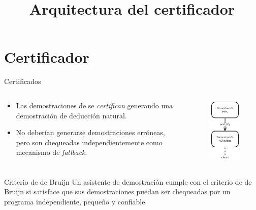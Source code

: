 \documentclass[xcolor={dvipsnames},spanish]{beamer}
\begin{document}
\section{Certificador}

\begin{frame}{Certificados}
    \begin{columns}
        
        \begin{column}{0.5\textwidth}
            \begin{itemize}
                \item Las demostraciones de \ppaLang{} se \textit{certifican} generando
                una demostración de deducción natural.
                \item No deberían generarse demostraciones erróneas, pero son chequeadas independientemente como mecanismo de \textit{fallback}.
            \end{itemize}
        \end{column}
        \begin{column}{0.5\textwidth}
            
            \begin{figure}
                \includegraphics[scale=0.32]{img/ppt/certify.png}
                \centering
                \title{Arquitectura del certificador}
            \end{figure}
        \end{column}
    \end{columns}

    \begin{block}{Criterio de de Bruijn}
        Un asistente de demostración cumple con el criterio de de Bruijn si
        satisface que sus demostraciones puedan ser chequeadas por un programa
        independiente, pequeño y confiable.
    \end{block}
\end{frame}
\end{document}

